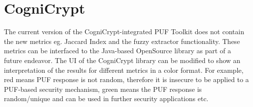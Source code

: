 \section{CogniCrypt}
The current version of the CogniCrypt-integrated PUF Toolkit does not contain the new metrics eg. Jaccard Index and the fuzzy extractor functionality. These metrics can be interfaced to the Java-based OpenSource library as part of a future endeavor. The UI of the CogniCrypt library can be modified to show an interpretation of the results for different metrics in a color format. For example, red means PUF response is not random, therefore it is insecure to be applied to a PUF-based
security mechanism, green means the PUF
response is random/unique and can be used in further security applications etc.\\




